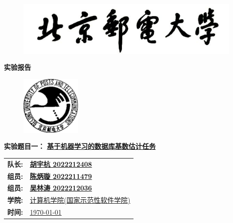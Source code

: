 \documentclass[UTF8, 12pt, a4paper, oneside]{ctexart}
\begin{document}
	\sloppy
	\thispagestyle{empty}
    \begin{figure}[t]
		\centering
		\includegraphics[width=13cm]{logo1.jpg}
	\end{figure}

    \begin{center}
        \Huge\textbf{实验报告}
    \end{center}
	\vspace*{1em}
    \begin{figure}[htbp]
		\centering
		\includegraphics[width=3cm]{logo2.jpg}
	\end{figure}
		\begin{center}
			\Huge\textbf{实验题目一：} \underline{\textbf{基于机器学习的数据库基数估计任务}} 
		\end{center}
    \vspace*{5em}
	\begin{table}[htbp]
		\centering
		\large
		\begin{tabular}{ll}
            \textbf{队长:} & \underline{\textbf{胡宇杭 2022212408}} \\
		    \textbf{组员:} & \underline{\textbf{陈炳璇 2022211479}}\\
		    \textbf{组员:} & \underline{\textbf{吴林涛 2022212036}} \\
		    \textbf{学院:} & \underline{计算机学院(国家示范性软件学院)} \\
            \textbf{时间:} & \underline{\today} \\
        \end{tabular}
		
	\end{table}
	\newpage
	\tableofcontents
    \newpage
    \begin{multicols*}{2}
        
        
        
        
    \end{multicols*}
\end{document}
